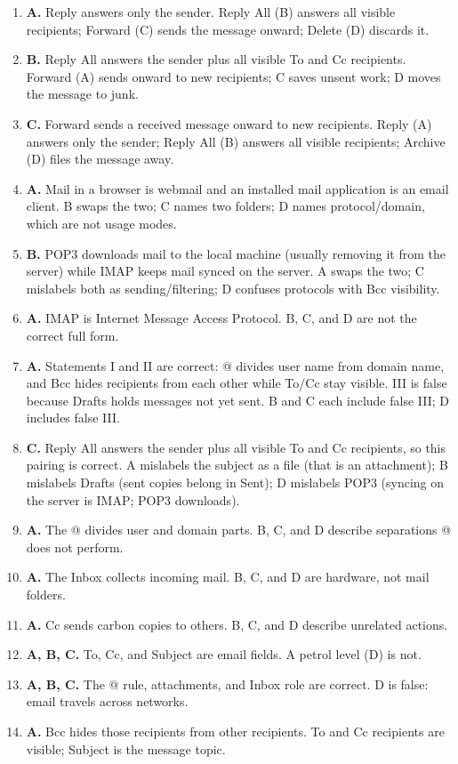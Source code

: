 \begin{enumerate}[label=\textbf{Q\arabic*.}, leftmargin=*]
\item \textbf{A.} Reply answers only the sender. Reply All (B) answers all
  visible recipients; Forward (C) sends the message onward; Delete (D)
  discards it.
\item \textbf{B.} Reply All answers the sender plus all visible To and Cc
  recipients. Forward (A) sends onward to new recipients; C saves unsent
  work; D moves the message to junk.
\item \textbf{C.} Forward sends a received message onward to new recipients.
  Reply (A) answers only the sender; Reply All (B) answers all visible
  recipients; Archive (D) files the message away.
\item \textbf{A.} Mail in a browser is webmail and an installed mail
  application is an email client. B swaps the two; C names two folders; D
  names protocol/domain, which are not usage modes.
\item \textbf{B.} POP3 downloads mail to the local machine (usually removing
  it from the server) while IMAP keeps mail synced on the server. A swaps
  the two; C mislabels both as sending/filtering; D confuses protocols with
  Bcc visibility.
\item \textbf{A.} IMAP is Internet Message Access Protocol. B, C, and D are
  not the correct full form.
\item \textbf{A.} Statements I and II are correct: @ divides user name from
  domain name, and Bcc hides recipients from each other while To/Cc stay
  visible. III is false because Drafts holds messages not yet sent. B and C
  each include false III; D includes false III.
\item \textbf{C.} Reply All answers the sender plus all visible To and Cc
  recipients, so this pairing is correct. A mislabels the subject as a file
  (that is an attachment); B mislabels Drafts (sent copies belong in Sent);
  D mislabels POP3 (syncing on the server is IMAP; POP3 downloads).

\item \textbf{A.} The @ divides user and domain parts. B, C, and D describe separations @ does not perform.
\item \textbf{A.} The Inbox collects incoming mail. B, C, and D are hardware, not mail folders.
\item \textbf{A.} Cc sends carbon copies to others. B, C, and D describe unrelated actions.
\item \textbf{A, B, C.} To, Cc, and Subject are email fields. A petrol level (D) is not.
\item \textbf{A, B, C.} The @ rule, attachments, and Inbox role are correct. D is false: email travels across networks.
\item \textbf{A.} Bcc hides those recipients from other recipients. To and Cc recipients are visible; Subject is the message topic.


\end{enumerate}

